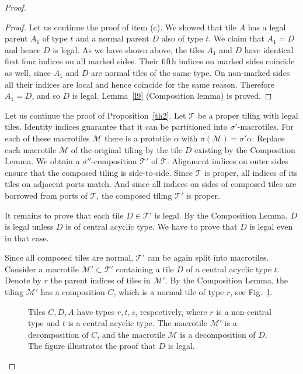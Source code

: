 \documentclass[10pt,a4paper]{amsart}
\begin{document}
\begin{proof}
\begin{proof}
Let us continue the proof of item (c). 
We showed that  tile $A$ has a legal parent $A_1$ of type $t$
and a normal parent $D$ also of type $t$.
We claim that $A_1=D$ and hence $D$ is legal.
As we have shown above, the tiles $A_1$ and $D$
have identical first four indices on all marked sides.
Their fifth indices on marked sides coincide as well, since $A_1$ and $D$ are normal tiles of the same type.
On non-marked sides all their indices are local and hence coincide for the same reason.
Therefore $A_1=D$, and so $D$ is legal. Lemma~\ref{l9} (Composition lemma) is proved.
  \end{proof}

Let us continue the proof of Proposition~\ref{th2}.
Let $\mathcal T$ be a proper tiling with legal tiles. 
Identity indices guarantee that it can be partitioned into $\sigma'$-macrotiles. For each of these macrotiles $\mathcal{M}$ there is a prototile $\alpha$ with $\pi(\mathcal{M})=\sigma'\alpha$.
Replace each macrotile $\mathcal M$ of the original tiling by the tile $D$ existing by 
the Composition Lemma.
  We obtain a $\sigma''$-composition $\mathcal T'$ of $\mathcal T$.
 Alignment indices on outer sides ensure that the composed tiling is  side-to-side.
Since $\mathcal T$ is proper, all indices of its tiles on adjacent ports match.
And since all indices on sides of composed tiles are borrowed from ports of $\mathcal T$,
the composed tiling $\mathcal T'$ is proper. 

  It remains to prove that each tile $D\in\mathcal T'$  is legal.
  By 
the Composition Lemma, $D$ is legal unless $D$ is of central
  acyclic type.
  We have to prove that  $D$ is legal even in that case.
  
Since all composed tiles are normal, $\mathcal T'$ can be again split into macrotiles.
Consider a macrotile $\mathcal M'\subset\mathcal T'$  containing a tile $D$ of a central acyclic  type $t$.
  Denote by $r$ the parent indices of tiles in $\mathcal M'$. By the Composition Lemma, the tiling $\mathcal M'$ has a composition 
$C$, which is a normal tile of type $r$,
see Fig.~\ref{f40}.
  \begin{figure}
    \begin{center}
      
    \end{center}
    \caption{Tiles $C,D,A$ have  types $r,t,s$, respectively, where $r$ is a non-central type and $t$
is a central acyclic type.
      The macrotile $\mathcal M'$ is a decomposition of $C$, and the macrotile $\mathcal M$ is a decomposition of $D$.
      The figure illustrates the proof that  $D$ is legal.}\label{f40}
  \end{figure}
   

\end{proof}
\end{document}
